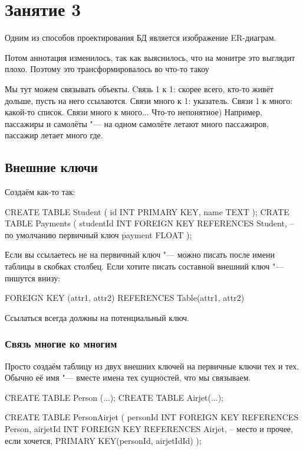 \chapter{Занятие 3}

Одним из способов проектирования БД является изображение ER-диаграм.

Потом аннотация изменилось, так как выяснилось, что на монитре это выглядит плохо.
Поэтому это трансформировалось во что-то такоу %

Мы тут можем связывать объекты.
Cвязь 1 к 1: скорее всего, кто-то живёт дольше, пусть на него ссылаются.
Связи много к 1: указатель.
Связи 1 к много: какой-то список.
Связи много к много... Что-то непонятное)
Например, пассажиры и самолёты "--- на одном самолёте летают много пассажиров, пассажир летает много где.

\section{Внешние ключи}

Создаём как-то так:
\begin{sqlcode}
CREATE TABLE Student (
	id INT PRIMARY KEY,
	name TEXT
);
CRATE TABLE Payments (
	studentId INT FOREIGN KEY REFERENCES Student, -- по умолчанию первичный ключ
	payment FLOAT
);
\end{sqlcode}

Если вы ссылаетесь не на первичный ключ "--- можно писать после имени таблицы в скобках столбец.
Если хотите писать составной внешний ключ "--- пишутся внизу:
\begin{sqlcode}
	FOREIGN KEY (attr1, attr2) REFERENCES Table(attr1, attr2)
\end{sqlcode}
Ссылаться всегда должны на потенциальный ключ.

\subsection{Связь многие ко многим}

Просто создаём таблицу из двух внешних ключей на первичные ключи тех и тех.
Обычно её имя "--- вместе имена тех сущностей, что мы связываем.

\begin{sqlcode}
CREATE TABLE Person (...);
CREATE TABLE Airjet(...);

CREATE TABLE PersonAirjet (
	personId INT FOREIGN KEY REFERENCES Person,
	airjetId INT FOREIGN KEY REFERENCES Airjet,
	-- место и прочее, если хочется,
	PRIMARY KEY(personId, airjetIdId)
);
\end{sqlcode}

